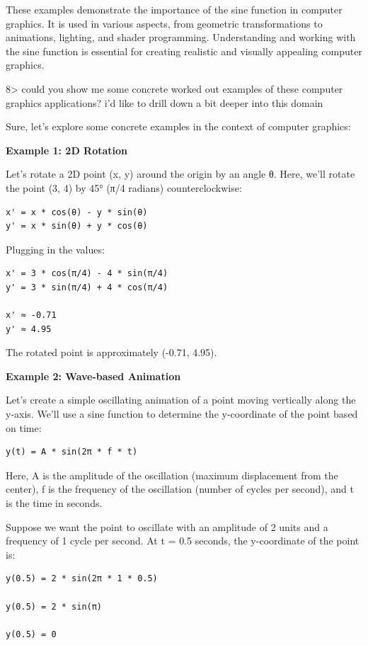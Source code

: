 \documentclass[
]{article}
\begin{document}
These examples demonstrate the importance of the sine function in
computer graphics. It is used in various aspects, from geometric
transformations to animations, lighting, and shader programming.
Understanding and working with the sine function is essential for
creating realistic and visually appealing computer graphics.

8\textgreater{} could you show me some concrete worked out examples of
these computer graphics applications? i'd like to drill down a bit
deeper into this domain

Sure, let's explore some concrete examples in the context of computer
graphics:

\textbf{Example 1: 2D Rotation}

Let's rotate a 2D point (x, y) around the origin by an angle θ. Here,
we'll rotate the point (3, 4) by 45° (π/4 radians) counterclockwise:

\begin{verbatim}
x' = x * cos(θ) - y * sin(θ)
y' = x * sin(θ) + y * cos(θ)
\end{verbatim}

Plugging in the values:

\begin{verbatim}
x' = 3 * cos(π/4) - 4 * sin(π/4)
y' = 3 * sin(π/4) + 4 * cos(π/4)

x' ≈ -0.71
y' ≈ 4.95
\end{verbatim}

The rotated point is approximately (-0.71, 4.95).

\textbf{Example 2: Wave-based Animation}

Let's create a simple oscillating animation of a point moving vertically
along the y-axis. We'll use a sine function to determine the
y-coordinate of the point based on time:

\begin{verbatim}
y(t) = A * sin(2π * f * t)
\end{verbatim}

Here, A is the amplitude of the oscillation (maximum displacement from
the center), f is the frequency of the oscillation (number of cycles per
second), and t is the time in seconds.

Suppose we want the point to oscillate with an amplitude of 2 units and
a frequency of 1 cycle per second. At t = 0.5 seconds, the y-coordinate
of the point is:

\begin{verbatim}
y(0.5) = 2 * sin(2π * 1 * 0.5)

y(0.5) = 2 * sin(π)

y(0.5) = 0
\end{verbatim}
\end{document}
